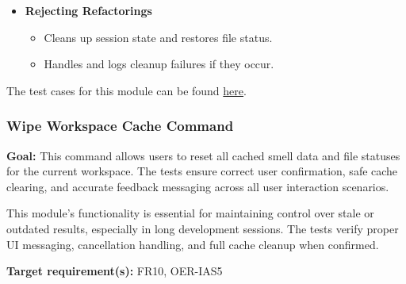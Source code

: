 \documentclass[12pt, titlepage]{article}
\begin{document}
\begin{itemize}
  \item \textbf{Rejecting Refactorings}
    \begin{itemize}
      \item Cleans up session state and restores file status.
      \item Handles and logs cleanup failures if they occur.
    \end{itemize}
\end{itemize}

\noindent The test cases for this module can be found
\href{https://github.com/ssm-lab/capstone--sco-vs-code-plugin/blob/plugin-multi-file/test/refactor.test.ts}{here}.

\subsubsection{Wipe Workspace Cache Command}

\textbf{Goal:} This command allows users to reset all cached smell data and file statuses for the current workspace. The tests ensure correct user confirmation, safe cache clearing, and accurate feedback messaging across all user interaction scenarios.

\medskip

\noindent This module’s functionality is essential for maintaining control over stale or outdated results, especially in long development sessions. The tests verify proper UI messaging, cancellation handling, and full cache cleanup when confirmed.

\medskip

\noindent\textbf{Target requirement(s):} FR10, OER-IAS5~\cite{SRS} \\
\end{document}
